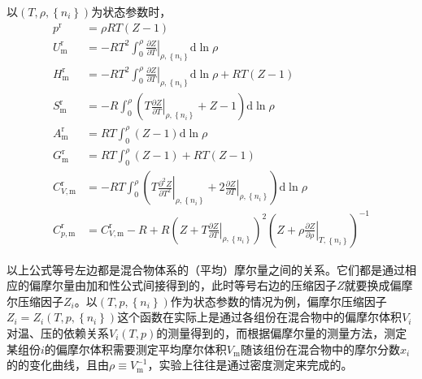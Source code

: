\documentclass[main.tex]{subfiles}
\begin{document}
以$\left(T,\rho,\left\{n_i\right\}\right)$为状态参数时，
\begin{align}
    p^\text{r}              & =\rho RT\left(Z-1\right)                                                                                                                                                                                       \\
    U_\text{m}^\text{r}     & =-RT^2\int_0^\rho\left.\frac{\partial Z}{\partial T}\right|_{\rho,\left\{n_i\right\}}\mathrm{d}\ln \rho                                                                                                        \\
    H_\text{m}^\text{r}     & =-RT^2\int_0^\rho\left.\frac{\partial Z}{\partial T}\right|_{\rho,\left\{n_i\right\}}\mathrm{d}\ln\rho+RT\left(Z-1\right)                                                                                      \\
    S_\text{m}^\text{r}     & =-R\int_0^\rho\left(T\left.\frac{\partial Z}{\partial T}\right|_{\rho,\left\{n_i\right\}}+Z-1\right)\mathrm{d}\ln\rho                                                                                          \\
    A_\text{m}^\text{r}     & =RT\int_0^\rho\left(Z-1\right)\mathrm{d}\ln\rho                                                                                                                                                                \\
    G_\text{m}^\text{r}     & =RT\int_0^\rho\left(Z-1\right)+RT\left(Z-1\right)                                                                                                                                                              \\
    C_{V,\text{m}}^\text{r} & =-RT\int_0^\rho\left(T\left.\frac{\partial^2 Z}{\partial T^2}\right|_{\rho,\left\{n_i\right\}}+2\left.\frac{\partial Z}{\partial T}\right|_{\rho,\left\{n_i\right\}}\right)\mathrm{d}\ln\rho                   \\
    C_{p,\text{m}}^\text{r} & =C_{V,\text{m}}^\text{r}-R+R\left(Z+T\left.\frac{\partial Z}{\partial T}\right|_{\rho,\left\{n_i\right\}}\right)^2\left(Z+\rho\left.\frac{\partial Z}{\partial \rho}\right|_{T,\left\{n_i\right\}}\right)^{-1}
\end{align}

以上公式等号左边都是混合物体系的（平均）摩尔量之间的关系。它们都是通过相应的偏摩尔量由加和性公式间接得到的，此时等号右边的压缩因子$Z$就要换成偏摩尔压缩因子$Z_i$。以$\left(T,p,\left\{n_i\right\}\right)$作为状态参数的情况为例，偏摩尔压缩因子$Z_i=Z_i\left(T,p,\left\{n_i\right\}\right)$这个函数在实际上是通过各组份在混合物中的偏摩尔体积$V_i$对温、压的依赖关系$V_i\left(T,p\right)$的测量得到的，而根据偏摩尔量的测量方法，测定某组份$i$的偏摩尔体积需要测定平均摩尔体积$V_\text{m}$随该组份在混合物中的摩尔分数$x_i$的的变化曲线，且由$\rho\equiv V^{-1}_\text{m}$，实验上往往是通过密度测定来完成的。
\end{document}
